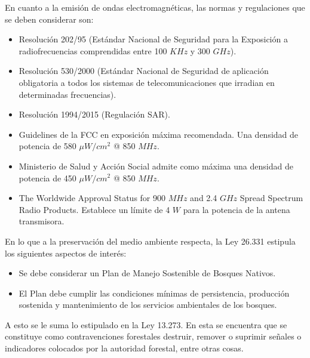 En cuanto a la emisión de ondas electromagnéticas, las normas y regulaciones que se deben considerar son:
\begin{itemize}
	\item Resolución 202/95 (Estándar Nacional de Seguridad para la Exposición a radiofrecuencias comprendidas entre 100 $KHz$ y 300 $GHz$).
	\item Resolución 530/2000 (Estándar Nacional de Seguridad de aplicación obligatoria a todos los sistemas de telecomunicaciones que irradian en determinadas frecuencias).
	\item Resolución 1994/2015 (Regulación SAR).
	\item Guidelines de la FCC en exposición máxima recomendada. Una densidad de potencia de 580 $\mu W/{cm}^2$ @ 850 $MHz$.
	\item Ministerio de Salud y Acción Social admite como máxima una densidad de potencia de 450 $\mu W/{cm}^2$ @ 850 $MHz$.
	\item The Worldwide Approval Status for 900 $MHz$ and 2.4 $GHz$ Spread Spectrum Radio Products. Establece un límite de 4 $W$ para la potencia de la antena transmisora.
\end{itemize}

En lo que a la preservación del medio ambiente respecta, la Ley 26.331 estipula los siguientes aspectos de interés:
\begin{itemize}
	\item Se debe considerar un Plan de Manejo Sostenible de Bosques Nativos.
	\item El Plan debe cumplir las condiciones mínimas de persistencia, producción sostenida y mantenimiento de los servicios ambientales de los bosques.
\end{itemize}

A esto se le suma lo estipulado en la Ley 13.273. En esta se encuentra que se constituye como contravenciones forestales destruir, remover o suprimir señales o indicadores colocados por la autoridad forestal, entre otras cosas.

